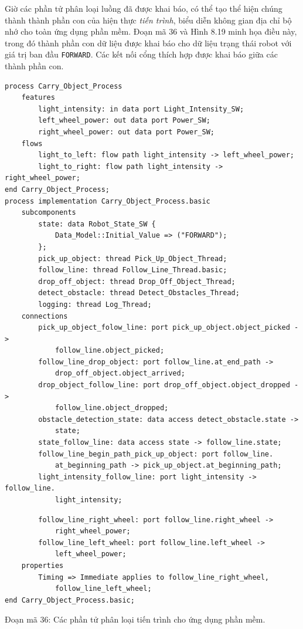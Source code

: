 Giờ các phần tử phân loại luồng đã được khai báo, có thể tạo thể hiện chúng thành thành phần con của hiện thực \emph{tiến trình}, biểu diễn không gian địa chỉ bộ nhớ cho toàn ứng dụng phần mềm. Đoạn mã 36 và Hình 8.19 minh họa điều này, trong đó thành phần con dữ liệu được khai báo cho dữ liệu trạng thái robot với giá trị ban đầu \texttt{FORWARD}. Các kết nối cổng thích hợp được khai báo giữa các thành phần con.
\begin{verbatim}
process Carry_Object_Process
    features
        light_intensity: in data port Light_Intensity_SW;
        left_wheel_power: out data port Power_SW;
        right_wheel_power: out data port Power_SW;
    flows
        light_to_left: flow path light_intensity -> left_wheel_power;
        light_to_right: flow path light_intensity -> right_wheel_power;
end Carry_Object_Process;
process implementation Carry_Object_Process.basic
    subcomponents
        state: data Robot_State_SW {
            Data_Model::Initial_Value => ("FORWARD");
        };
        pick_up_object: thread Pick_Up_Object_Thread;
        follow_line: thread Follow_Line_Thread.basic;
        drop_off_object: thread Drop_Off_Object_Thread;
        detect_obstacle: thread Detect_Obstacles_Thread;
        logging: thread Log_Thread;
    connections
        pick_up_object_folow_line: port pick_up_object.object_picked ->
            follow_line.object_picked;
        follow_line_drop_object: port follow_line.at_end_path ->
            drop_off_object.object_arrived;
        drop_object_follow_line: port drop_off_object.object_dropped ->
            follow_line.object_dropped;
        obstacle_detection_state: data access detect_obstacle.state ->
            state;
        state_follow_line: data access state -> follow_line.state;
        follow_line_begin_path_pick_up_object: port follow_line.
            at_beginning_path -> pick_up_object.at_beginning_path;
        light_intensity_follow_line: port light_intensity -> follow_line.
            light_intensity;
\end{verbatim}
\begin{verbatim}
        follow_line_right_wheel: port follow_line.right_wheel ->
            right_wheel_power;
        follow_line_left_wheel: port follow_line.left_wheel ->
            left_wheel_power;
    properties
        Timing => Immediate applies to follow_line_right_wheel,
            follow_line_left_wheel;
end Carry_Object_Process.basic;
\end{verbatim}
\begin{center}\small Đoạn mã 36: Các phần tử phân loại tiến trình cho ứng dụng phần mềm.\end{center}

